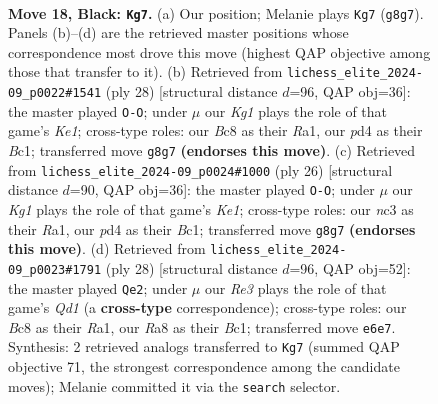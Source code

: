 \documentclass[11pt]{article}
\begin{document}
\clearpage

\begin{figure}[p]\centering
\begin{subfigure}{0.46\textwidth}\centering
\resizebox{\linewidth}{!}{%
\newchessgame
\chessboard[
  setfen={rnbq2k1/pp5p/2p1r2p/3p4/PP1P2Pb/2N1PP2/2QKN3/R4B1R b - - 0 18},
  showmover=false,
  pgfstyle=straightmove, color=movearrow, markmove={g8-g7}
]}
\caption{}
\end{subfigure}\hfill
\begin{subfigure}{0.46\textwidth}\centering
\resizebox{\linewidth}{!}{%
\newchessgame
\chessboard[
  setfen={rn1qr1k1/p4ppp/b2p1n2/2pP4/8/P4BP1/1P2NP1P/R1BQK2R w KQ - 0 15},
  showmover=false,
  pgfstyle=straightmove, color=movearrow, markmove={e1-g1}
]}
\caption{}
\end{subfigure}
\\[4pt]
\begin{subfigure}{0.46\textwidth}\centering
\resizebox{\linewidth}{!}{%
\newchessgame
\chessboard[
  setfen={rn1qr1k1/pp3ppp/5n2/2pP1b2/8/P5P1/1P2NPBP/R1BQK2R w KQ - 2 14},
  showmover=false,
  pgfstyle=straightmove, color=movearrow, markmove={e1-g1}
]}
\caption{}
\end{subfigure}\hfill
\begin{subfigure}{0.46\textwidth}\centering
\resizebox{\linewidth}{!}{%
\newchessgame
\chessboard[
  setfen={r2qk2r/1p1n1pp1/p3pn2/2b5/4P1Pp/2N4P/PP3PB1/R1BQ1RK1 w kq - 1 15},
  showmover=false,
  pgfstyle=straightmove, color=movearrow, markmove={d1-e2}
]}
\caption{}
\end{subfigure}
\caption{\textbf{Move 18, Black: \texttt{Kg7}.} (a) Our position; Melanie plays \texttt{Kg7} (\texttt{g8g7}). Panels (b)--(d) are the retrieved master positions whose correspondence most drove this move (highest QAP objective among those that transfer to it). (b) Retrieved from \texttt{lichess\_elite\_2024-09\_p0022\#1541} (ply 28) [structural distance $d$=96, QAP obj=36]: the master played \texttt{O-O}; under $\mu$ our \emph{Kg1} plays the role of that game's \emph{Ke1}; cross-type roles: our \emph{B}c8 as their \emph{R}a1, our \emph{p}d4 as their \emph{B}c1; transferred move \texttt{g8g7} \textbf{(endorses this move)}. (c) Retrieved from \texttt{lichess\_elite\_2024-09\_p0024\#1000} (ply 26) [structural distance $d$=90, QAP obj=36]: the master played \texttt{O-O}; under $\mu$ our \emph{Kg1} plays the role of that game's \emph{Ke1}; cross-type roles: our \emph{n}c3 as their \emph{R}a1, our \emph{p}d4 as their \emph{B}c1; transferred move \texttt{g8g7} \textbf{(endorses this move)}. (d) Retrieved from \texttt{lichess\_elite\_2024-09\_p0023\#1791} (ply 28) [structural distance $d$=96, QAP obj=52]: the master played \texttt{Qe2}; under $\mu$ our \emph{Re3} plays the role of that game's \emph{Qd1} (a \textbf{cross-type} correspondence); cross-type roles: our \emph{B}c8 as their \emph{R}a1, our \emph{R}a8 as their \emph{B}c1; transferred move \texttt{e6e7}. Synthesis: 2 retrieved analogs transferred to \texttt{Kg7} (summed QAP objective 71, the strongest correspondence among the candidate moves); Melanie committed it via the \texttt{search} selector.}
\label{fig:thought-m35}
\end{figure}
\end{document}
